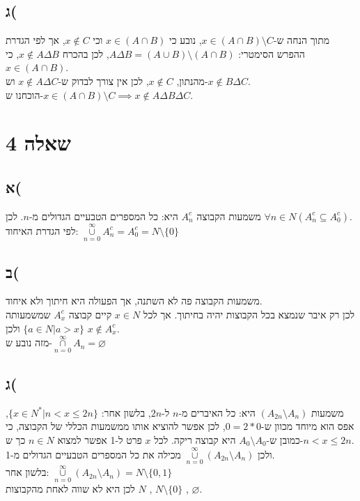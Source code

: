 \documentclass{article}
\begin{document}
\subsection*{ג(}

מתוך הנחה ש-$x \in (A \cap  B) \setminus C$, נובע כי $x \in (A \cap B) $ וכי $x \not\in C $, אך לפי הגדרת ההפרש הסימטרי: $A \Delta B = (A \cup  B) \setminus  (A \cap  B)$, לכן בהכרח $x \notin A \Delta B$, כי $x \in (A \cap B)$.  \\
מהנתון, $x \not\in C $, לכן אין צורך לבדוק ש-$x \not\in A \Delta C$ וש-$x \not\in B \Delta C$.\\
הוכחנו ש-$x \in (A \cap  B) \setminus C \implies x \not\in A \Delta B \Delta C$.

\section*{שאלה 4}
\subsection*{א(}
משמעות הקבוצה  $A_n^{c}$ היא: כל המספרים הטבעיים הגדולים מ-$n$. לכן $\forall n \in N (A_n^{c} \subseteq A_0^{c})$.\\
לפי הגדרת האיחוד: $\underset{n=0}{\overset{\infty}{\cup }} A_n^{c} = A_0^{c} = N \setminus \{0\}$
  
\subsection*{ב(}

משמעות הקבוצה פה לא השתנה, אך הפעולה היא חיתוך ולא איחוד.\\
לכן רק איבר שנמצא בכל הקבוצות יהיה בחיתוך. אך לכל $x \in N$ קיים קבוצה  $A_x^{c}$ שמשמעותה $\{a \in N | a > x \}$ ולכן $x \not\in A_x^{c}$.\\
מזה נובע ש-$ \underset{n=0}{\overset{\infty}{\cap }} A_n = \varnothing$


\subsection*{ג(}
משמעות $(A_{2n} \setminus A_n)$ היא: כל האיברים מ-$n$ ל-$2n$, בלשון אחר: $\{x \in  N^{*} | n < x \le 2n \}$, 
אפס הוא מיוחד מכוון ש-$0 = 2*0$, לכן אפשר להוציא אותו ממשמעות הכללי של הקבוצה,
כי כמובן ש-$A_0 \setminus  A_0$ היא קבוצה ריקה. לכל $x$ פרט ל-1 אפשר למצוא $n \in N$ 
כך ש-$n < x \le 2n$.\\
ולכן $\underset{n=0}{\overset{\infty}{\cup }} (A_{2n} \setminus  A_n)$ מכילה את כל
המספרים הטבעיים הגדולים מ-1.\\
בלשון אחר: $\underset{n=0}{\overset{\infty}{\cup }} (A_{2n} \setminus  A_n) = N \setminus \{0,1\}$\\
לכן היא לא שווה לאחת מהקבוצות $N$ ,  $N \setminus \{0\}$ , $ \varnothing $.
\end{document}
